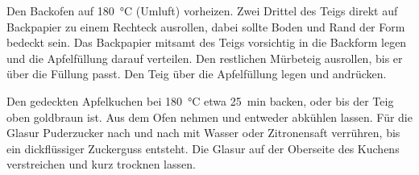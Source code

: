 \begin{recipeDP}
{        \step Den Backofen auf \SI{180}{\celsius} (Umluft) vorheizen.
        Zwei Drittel des Teigs direkt auf Backpapier zu einem Rechteck ausrollen, dabei sollte Boden und Rand der Form bedeckt sein.
        Das Backpapier mitsamt des Teigs vorsichtig in die Backform legen und die Apfelfüllung darauf verteilen.
        Den restlichen Mürbeteig ausrollen, bis er über die Füllung passt.
        Den Teig über die Apfelfüllung legen und andrücken.

        \step Den gedeckten Apfelkuchen bei \SI{180}{\celsius} etwa \SI[]{25}{\minute} backen, oder bis der Teig oben goldbraun ist.
        Aus dem Ofen nehmen und entweder abkühlen lassen.
        Für die Glasur Puderzucker nach und nach mit Wasser oder Zitronensaft verrühren, bis ein dickflüssiger Zuckerguss entsteht.
        Die Glasur auf der Oberseite des Kuchens verstreichen und kurz trocknen lassen.
    }



\end{recipeDP}